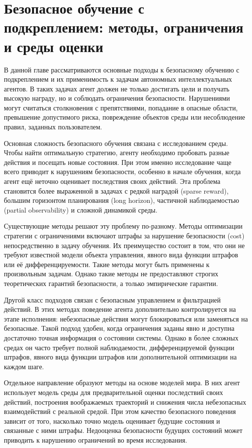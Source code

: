 ﻿\chapter{Безопасное обучение с подкреплением: методы, ограничения и среды оценки}
\label{ch:related_work}

В данной главе рассматриваются основные подходы к безопасному обучению с подкреплением и их применимость к задачам автономных интеллектуальных агентов. В таких задачах агент должен не только достигать цели и получать высокую награду, но и соблюдать ограничения безопасности. Нарушениями могут считаться столкновения с препятствиями, попадание в опасные области, превышение допустимого риска, повреждение объектов среды или несоблюдение правил, заданных пользователем.

Основная сложность безопасного обучения связана с исследованием среды. Чтобы найти оптимальную стратегию, агенту необходимо пробовать разные действия и посещать новые состояния. При этом именно исследование чаще всего приводит к нарушениям безопасности, особенно в начале обучения, когда агент ещё неточно оценивает последствия своих действий. Эта проблема становится более выраженной в задачах с редкой наградой (sparse reward), большим горизонтом планирования (long horizon), частичной наблюдаемостью (partial observability) и сложной динамикой среды.

Существующие методы решают эту проблему по-разному. Методы оптимизации стратегии с ограничениями включают штрафы за нарушение безопасности (cost) непосредственно в задачу обучения. Их преимущество состоит в том, что они не требуют известной модели объекта управления, явного вида функции штрафов или её дифференцируемости. Такие методы могут быть применены к произвольным задачам. Однако такие методы не предоставляют строгих теоретических гарантий безопасности, а только эмпирические гарантии.

Другой класс подходов связан с безопасным управлением и фильтрацией действий. В этих методах поведение агента дополнительно контролируется на этапе исполнения: небезопасные действия могут блокироваться или заменяться на безопасные. Такой подход удобен, когда ограничения заданы явно и доступна достаточно точная информация о состоянии системы. Однако в более сложных средах он часто требует полной наблюдаемости, дифференцируемой функции штрафов, явного вида функции штрафов или дополнительной оптимизации на каждом шаге.

Отдельное направление образуют методы на основе моделей мира. В них агент использует модель среды для предварительной оценки последствий своих действий, построения воображаемых траекторий и снижения числа небезопасных взаимодействий с реальной средой. При этом качество безопасного поведения зависит от того, насколько точно модель оценивает будущие состояния и связанные с ними штрафы. Недооценка безопасности будущих состояний может приводить к нарушению ограничений во время исследования.

